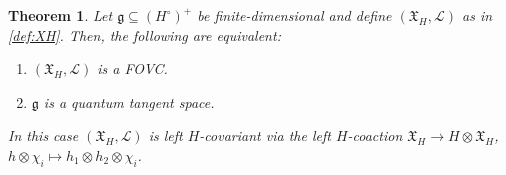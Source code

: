 \documentclass{article}
\newtheorem{theorem}[thm]{Theorem}
\theoremstyle{definition}
\begin{document}
	
	\begin{theorem}\label{dual-thm}
		Let $\mathfrak{g}\subseteq(H^\circ)^+$ be finite-dimensional and define $(\mathfrak{X}_H,\mathscr{L})$ as in \eqref{def:XH}.
		Then, the following are equivalent:
		
		\begin{enumerate}
			\item[i.)] $(\mathfrak{X}_H,\mathscr{L})$ is a FOVC.
			
			\item[ii.)] $\mathfrak{g}$ is a quantum tangent space.
		\end{enumerate}
		In this case $(\mathfrak{X}_H,\mathscr{L})$ is left $H$-covariant via the left $H$-coaction $\mathfrak{X}_H\to H\otimes\mathfrak{X}_H$, $h\otimes\chi_i\mapsto h_1\otimes h_2\otimes\chi_i$.
	\end{theorem}
\end{document}
